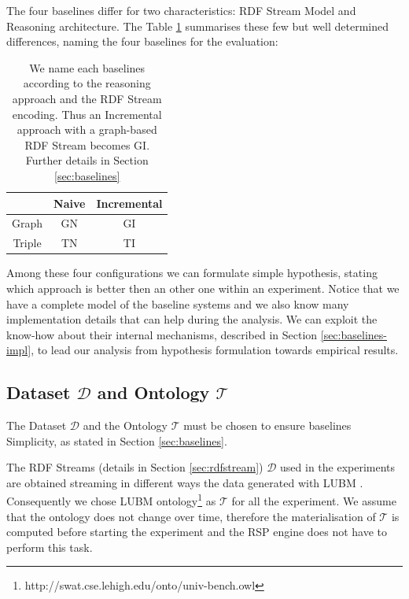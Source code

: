 The four baselines differ for two characteristics: RDF Stream Model and Reasoning architecture. The Table \ref{tab:baselines-names} summarises these few but well determined differences, naming the four baselines for the evaluation:\begin{table}[htb]
\scriptsize
\centering
\begin{tabular}{c|cc} %
	\hline
         & Naive & Incremental\\
	\hline
	Graph        &  GN      & GI\\
	Triple   &  TN   & TI\\
	\hline %
\end{tabular}
\caption[Baselines Naming Convention]{We name each baselines according to  the reasoning approach and the RDF Stream encoding. Thus an Incremental approach with a graph-based RDF Stream becomes GI. Further details in Section \ref{sec:baselines}}
\label{tab:baselines-names}
\end{table}

\noindent Among these four configurations we can formulate simple hypothesis, stating which approach is better then an other one within an experiment. Notice that we have a complete model of the baseline systems and we also know many implementation details that can help during the analysis. We can exploit the know-how about their internal mechanisms, described in Section \ref{sec:baselines-impl}, to lead our analysis from hypothesis formulation towards empirical results. 

\subsection{Dataset $\mathcal{D}$ and Ontology $\mathcal{T}$}\label{sec:dataset}

\noindent The Dataset  $\mathcal{D}$ and the Ontology $\mathcal{T}$ must be chosen to ensure baselines Simplicity, as stated in Section \ref{sec:baselines}. 

The RDF Streams (details in Section \ref{sec:rdfstream}) $\mathcal{D}$ used in the experiments are obtained streaming in different ways the data generated with LUBM  \cite{Guo2005}. Consequently we chose LUBM ontology\footnote{http://swat.cse.lehigh.edu/onto/univ-bench.owl} as $\mathcal{T}$ for all the experiment. We assume that the ontology does not change over time, therefore the materialisation of $\mathcal{T}$ is computed before starting the experiment and the RSP engine does not have to perform this task. 


